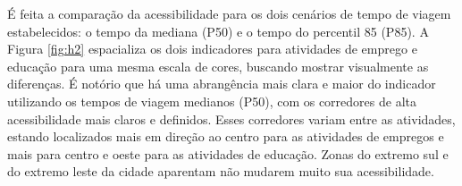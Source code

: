 \documentclass[        
    a4paper,          %
    12pt,             %
    chapter=TITLE,    %
    section=Title,    %
    subsection=Title, %
    oneside,          %
    english,          %
    spanish,          %
    brazil,           %
    fleqn             %
]{abntex2}
\begin{document}
  É feita a comparação da acessibilidade para os dois cenários de tempo de viagem estabelecidos: o tempo da mediana (P50) e o tempo do percentil 85 (P85). A Figura \ref{fig:h2} espacializa os dois indicadores para atividades de emprego e educação para uma mesma escala de cores, buscando mostrar visualmente as diferenças. É notório que há uma abrangência mais clara e maior do indicador utilizando os tempos de viagem medianos (P50), com os corredores de alta acessibilidade mais claros e definidos. Esses corredores variam entre as atividades, estando localizados mais em direção ao centro para as atividades de empregos e mais para centro e oeste para as atividades de educação. Zonas do extremo sul e do extremo leste da cidade aparentam não mudarem muito sua acessibilidade.
  
  \begin{figure}[!h]
  \captionsetup{width=16cm}
  \centering
  \end{figure}
  
\end{document}
